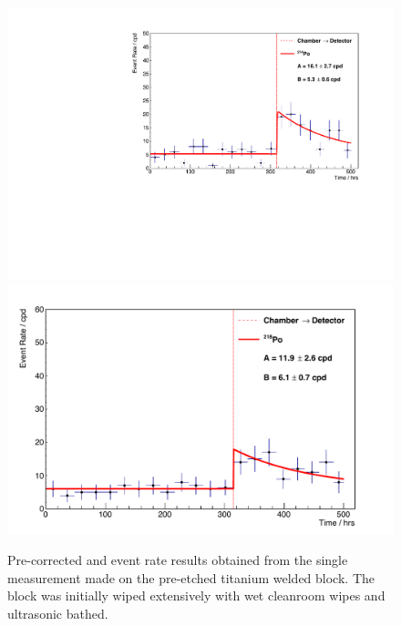 \begin{figure}[h!]
    \centering
    \includegraphics[scale=0.42]{Chapter_4/Figures/ucl_measurements/titanium_welding_block_pre_etching_1_Po214.pdf}
    \includegraphics[scale=0.42]{Chapter_4/Figures/ucl_measurements/titanium_welding_block_pre_etching_1_Po218.pdf}
    \caption[Pre-corrected \PoTOF{} and \PoTOE{} event rate results obtained from the single measurement made on the pre-etched titanium welded block.]
    {Pre-corrected \PoTOF{} and \PoTOE{} event rate results obtained from the single measurement made on the pre-etched titanium welded block. The block was initially wiped extensively with wet cleanroom wipes and ultrasonic bathed.}
    \label{fig:ti_pre_etched_welded_block_results}
\end{figure}
%
%
